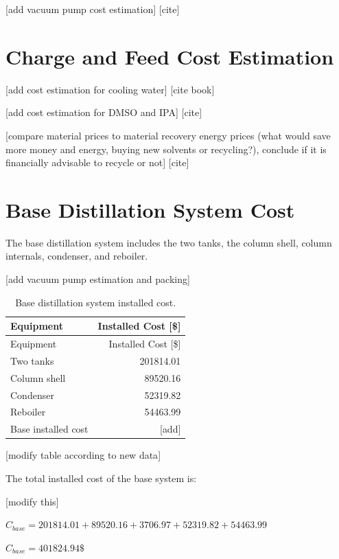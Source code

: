 {[}add vacuum pump cost estimation{]} {[}cite{]}

\section{Charge and Feed Cost
Estimation}\label{charge-and-feed-cost-estimation}

{[}add cost estimation for cooling water{]} {[}cite book{]}

{[}add cost estimation for DMSO and IPA{]} {[}cite{]}

{[}compare material prices to material recovery energy prices (what
would save more money and energy, buying new solvents or recycling?),
conclude if it is financially advisable to recycle or not{]} {[}cite{]}

\section{Base Distillation System
Cost}\label{base-distillation-system-cost}

The base distillation system includes the two tanks, the column shell,
column internals, condenser, and reboiler.

{[}add vacuum pump estimation and packing{]}

\begin{longtable}[]{@{}lr@{}}
\caption{Base distillation system installed cost.
\label{tab:Base distillation system installed cost.}}\tabularnewline
\toprule\noalign{}
Equipment & Installed Cost {[}\${]} \\
\midrule\noalign{}
\endfirsthead
\toprule\noalign{}
Equipment & Installed Cost {[}\${]} \\
\midrule\noalign{}
\endhead
\bottomrule\noalign{}
\endlastfoot
Two tanks & 201814.01 \\
Column shell & 89520.16 \\
Condenser & 52319.82 \\
Reboiler & 54463.99 \\
Base installed cost & {[}add{]} \\
\end{longtable}

{[}modify table according to new data{]}

The total installed cost of the base system is:

{[}modify this{]}

\(C_{base} = 201814.01 + 89520.16 + 3706.97 + 52319.82 + 54463.99\)

\(C_{base} = 401824.94 \text{\$}\)

